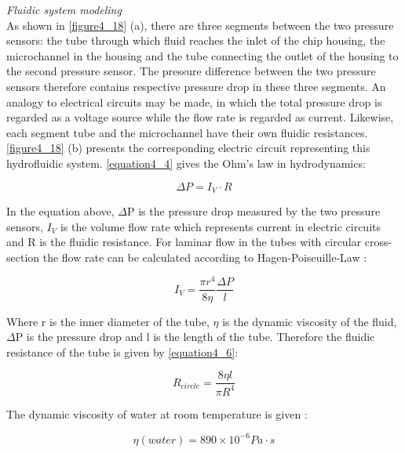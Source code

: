 \noindent \textit{Fluidic system modeling}\\

As shown in \autoref{figure4_18} (a), there are three segments between the two pressure sensors: the tube through which fluid reaches the inlet of the chip housing, the microchannel in the housing and the tube connecting the outlet of the housing to the second pressure sensor. The pressure difference between the two pressure sensors therefore contains respective pressure drop in these three segments. An analogy to electrical circuits may be made, in which the total pressure drop is regarded as a voltage source while the flow rate is regarded as current. Likewise, each segment tube and the microchannel have their own fluidic resistances. \autoref{figure4_18} (b) presents the corresponding electric circuit representing this hydrofluidic system. \autoref{equation4_4} gives the Ohm's law in hydrodynamics:

\begin{equation}
    \Delta P=I_V\cdot R
    \label{equation4_4}
\end{equation}

In the equation above, $\Delta$P is the pressure drop measured by the two pressure sensors, $I_V$ is the volume flow rate which represents current in electric circuits and R is the fluidic resistance. For laminar flow in the tubes with circular cross-section the flow rate can be calculated according to Hagen-Poiseuille-Law \cite{hpequation}:

\begin{equation}
    I_V=\frac{\pi r^4}{8\eta} \frac{\Delta P}{l}
    \label{equation4_5}
\end{equation}

Where r is the inner diameter of the tube, $\eta$ is the dynamic viscosity of the fluid, $\Delta$P is the pressure drop and l is the length of the tube. Therefore the fluidic resistance of the tube is given by \autoref{equation4_6}:

\begin{equation}
    R_{circle}=\frac{8\eta l}{\pi R^4}
    \label{equation4_6}
\end{equation}

The dynamic viscosity of water at room temperature is given \cite{waterviscosity}:

\begin{equation}
    \eta (water)=890\times 10^{-6} Pa\cdot s
    \label{equation4_7}
\end{equation}

